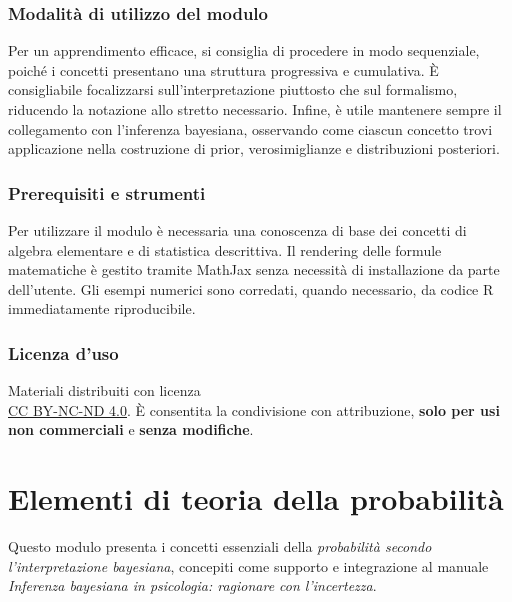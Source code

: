\documentclass[
  letterpaper,
  DIV=11,
  numbers=noendperiod,
  oneside]{scrreprt}
\theoremstyle{definition}
\theoremstyle{plain}
\theoremstyle{definition}
\theoremstyle{remark}
\begin{document}
\section*{Modalità di utilizzo del
modulo}\label{modalituxe0-di-utilizzo-del-modulo}


Per un apprendimento efficace, si consiglia di procedere in modo
sequenziale, poiché i concetti presentano una struttura progressiva e
cumulativa. È consigliabile focalizzarsi sull'interpretazione piuttosto
che sul formalismo, riducendo la notazione allo stretto necessario.
Infine, è utile mantenere sempre il collegamento con l'inferenza
bayesiana, osservando come ciascun concetto trovi applicazione nella
costruzione di prior, verosimiglianze e distribuzioni posteriori.

\section*{Prerequisiti e strumenti}\label{prerequisiti-e-strumenti}


Per utilizzare il modulo è necessaria una conoscenza di base dei
concetti di algebra elementare e di statistica descrittiva. Il rendering
delle formule matematiche è gestito tramite MathJax senza necessità di
installazione da parte dell'utente. Gli esempi numerici sono corredati,
quando necessario, da codice R immediatamente riproducibile.

\section*{Licenza d'uso}\label{licenza-duso}


Materiali distribuiti con licenza\\
\href{https://creativecommons.org/licenses/by-nc-nd/4.0/deed.it}{CC
BY-NC-ND 4.0}. È consentita la condivisione con attribuzione,
\textbf{solo per usi non commerciali} e \textbf{senza modifiche}.

\part{Elementi di teoria della probabilità}

Questo modulo presenta i concetti essenziali della \emph{probabilità
secondo l'interpretazione bayesiana}, concepiti come supporto e
integrazione al manuale \emph{Inferenza bayesiana in psicologia:
ragionare con l'incertezza}.
\end{document}
